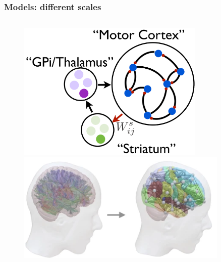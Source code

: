 \begin{frame}[c]
  \frametitle{Models: different scales}
  \pause{}
  \begin{columns}
    \begin{column}{0.5\textwidth}
      \begin{figure}[h]
        \centering
        \includegraphics[width=0.8\textwidth]{99_images/Murray2019-4b}\\\vspace{0.2cm}
        \includegraphics[width=0.9\textwidth]{99_images/TVB}\\
      \end{figure}%
    \end{column}
\end{columns}
\end{frame}

